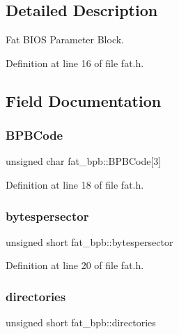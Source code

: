 \subsection{Detailed Description}
Fat B\+I\+OS Parameter Block. 

Definition at line 16 of file fat.\+h.



\subsection{Field Documentation}
\mbox{\label{a00053_a692e2fbe0857aa497a3bcf8ef2f14a5d_a692e2fbe0857aa497a3bcf8ef2f14a5d}} 
\subsubsection{\texorpdfstring{B\+P\+B\+Code}{BPBCode}}
{\footnotesize\ttfamily unsigned char fat\+\_\+bpb\+::\+B\+P\+B\+Code\mbox{[}3\mbox{]}}



Definition at line 18 of file fat.\+h.

\mbox{\label{a00053_a99b879ef2b4ebb9d64c3cd29a098cef8_a99b879ef2b4ebb9d64c3cd29a098cef8}} 
\subsubsection{\texorpdfstring{bytespersector}{bytespersector}}
{\footnotesize\ttfamily unsigned short fat\+\_\+bpb\+::bytespersector}



Definition at line 20 of file fat.\+h.

\mbox{\label{a00053_a9d593b3eed8b2aad45be25375b167b39_a9d593b3eed8b2aad45be25375b167b39}} 
\subsubsection{\texorpdfstring{directories}{directories}}
{\footnotesize\ttfamily unsigned short fat\+\_\+bpb\+::directories}



